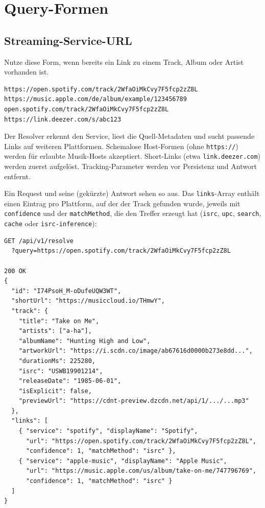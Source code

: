 \documentclass[11pt,a4paper]{article}
\newcommand{\code}[1]{\texttt{#1}}
\begin{document}
\section{Query-Formen}

\subsection{Streaming-Service-URL}

Nutze diese Form, wenn bereits ein Link zu einem Track, Album oder Artist vorhanden ist.

\begingroup\small\begin{verbatim}
https://open.spotify.com/track/2WfaOiMkCvy7F5fcp2zZ8L
https://music.apple.com/de/album/example/123456789
open.spotify.com/track/2WfaOiMkCvy7F5fcp2zZ8L
https://link.deezer.com/s/abc123
\end{verbatim}\endgroup

Der Resolver erkennt den Service, liest die Quell-Metadaten und sucht passende Links auf weiteren Plattformen. Schemalose Host-Formen (ohne \code{https://}) werden für erlaubte Musik-Hosts akzeptiert. Short-Links (etwa \code{link.deezer.com}) werden zuerst aufgelöst. Tracking-Parameter werden vor Persistenz und Antwort entfernt.

Ein Request und seine (gekürzte) Antwort sehen so aus. Das \code{links}-Array enthält einen Eintrag pro Plattform, auf der der Track gefunden wurde, jeweils mit \code{confidence} und der \code{matchMethod}, die den Treffer erzeugt hat (\code{isrc}, \code{upc}, \code{search}, \code{cache} oder \code{isrc-inference}):

\begingroup\small\begin{verbatim}
GET /api/v1/resolve
  ?query=https://open.spotify.com/track/2WfaOiMkCvy7F5fcp2zZ8L

200 OK
{
  "id": "I74PsoH_M-oDufeUQW3WT",
  "shortUrl": "https://musiccloud.io/THmwY",
  "track": {
    "title": "Take on Me",
    "artists": ["a-ha"],
    "albumName": "Hunting High and Low",
    "artworkUrl": "https://i.scdn.co/image/ab67616d0000b273e8dd...",
    "durationMs": 225280,
    "isrc": "USWB19901214",
    "releaseDate": "1985-06-01",
    "isExplicit": false,
    "previewUrl": "https://cdnt-preview.dzcdn.net/api/1/.../...mp3"
  },
  "links": [
    { "service": "spotify", "displayName": "Spotify",
      "url": "https://open.spotify.com/track/2WfaOiMkCvy7F5fcp2zZ8L",
      "confidence": 1, "matchMethod": "isrc" },
    { "service": "apple-music", "displayName": "Apple Music",
      "url": "https://music.apple.com/us/album/take-on-me/747796769",
      "confidence": 1, "matchMethod": "isrc" }
  ]
}
\end{verbatim}\endgroup
\end{document}
